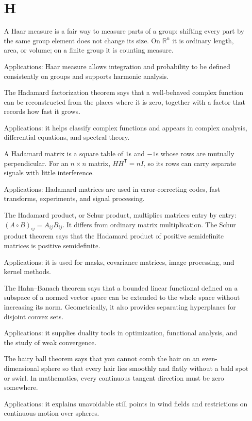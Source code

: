 \chapter*{H}
\label{chap:h}

A Haar measure is a fair way to measure parts of a group: shifting every part by the same group element does not change its size. On $\mathbb{R}^n$ it is ordinary length, area, or volume; on a finite group it is counting measure. \par\noindent Applications: Haar measure allows integration and probability to be defined consistently on groups and supports harmonic analysis.

The Hadamard factorization theorem says that a well-behaved complex function can be reconstructed from the places where it is zero, together with a factor that records how fast it grows. \par\noindent Applications: it helps classify complex functions and appears in complex analysis, differential equations, and spectral theory.

A Hadamard matrix is a square table of $1$s and $-1$s whose rows are mutually perpendicular. For an $n\times n$ matrix, $HH^{\mathsf T}=nI$, so its rows can carry separate signals with little interference. \par\noindent Applications: Hadamard matrices are used in error-correcting codes, fast transforms, experiments, and signal processing.

The Hadamard product, or Schur product, multiplies matrices entry by entry: $(A\circ B)_{ij}=A_{ij}B_{ij}$. It differs from ordinary matrix multiplication. The Schur product theorem says that the Hadamard product of positive semidefinite matrices is positive semidefinite. \par\noindent Applications: it is used for masks, covariance matrices, image processing, and kernel methods.

The Hahn--Banach theorem says that a bounded linear functional defined on a subspace of a normed vector space can be extended to the whole space without increasing its norm. Geometrically, it also provides separating hyperplanes for disjoint convex sets. \par\noindent Applications: it supplies duality tools in optimization, functional analysis, and the study of weak convergence.

The hairy ball theorem says that you cannot comb the hair on an even-dimensional sphere so that every hair lies smoothly and flatly without a bald spot or swirl. In mathematics, every continuous tangent direction must be zero somewhere. \par\noindent Applications: it explains unavoidable still points in wind fields and restrictions on continuous motion over spheres.

